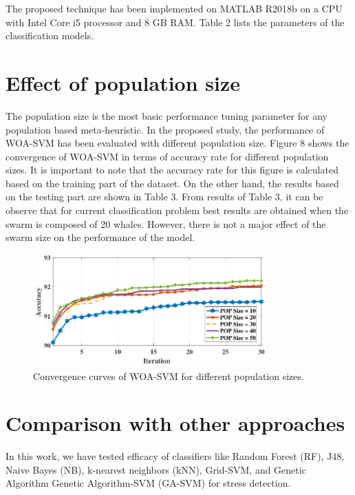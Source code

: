 \documentclass{article}
\begin{document}
The proposed technique has been implemented on MATLAB R2018b on a CPU with Intel Core i5 processor and 8 GB RAM. Table 2 lists the parameters of the classification models.


\section{Effect of population size}


The population size is the most basic performance tuning parameter for any population based meta-heuristic. In the proposed study, the performance of WOA-SVM has been evaluated with different population size. Figure 8 shows the convergence of WOA-SVM in terms of accuracy rate for different population sizes. It is important to note that the accuracy rate for this figure is calculated based on the training part of the dataset. On the other hand, the results based on the testing part are shown in Table 3. From results of Table 3, it can be observe that for current classification problem best results are obtained when the swarm is composed of 20 whales. However, there is not a major effect of the swarm size on the performance of the model.


\begin{figure}[htbp]
\centering
\includegraphics[width=0.8\textwidth]{images/43d14d83c76062f457f9dc0086d5e9adf103e161a24a04f5af03173f16073b4b.jpg}
\caption{Convergence curves of WOA-SVM for different population sizes.}
\end{figure}


\section{Comparison with other approaches}


In this work, we have tested efficacy of classifiers like Random Forest (RF), J48, Naive Bayes (NB), k-nearest neighbors (kNN), Grid-SVM, and Genetic Algorithm Genetic Algorithm-SVM (GA-SVM) for stress detection.
\end{document}
